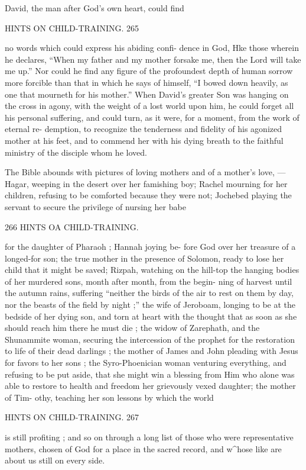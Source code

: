 \documentclass[
]{book}
\begin{document}
David, the man after God's own heart, could find

HINTS ON CHILD-TRAINING. 265

no words which could express his abiding confi- dence in God, Hke those wherein he declares, ``When my father and my mother forsake me, then the Lord will take me up.'' Nor could he find any figure of the profoundest depth of human sorrow more forcible than that in which he says of himself, ``I bowed down heavily, as one that mourneth for his mother.'' When David's greater Son was hanging on the cross in agony, with the weight of a lost world upon him, he could forget all his personal suffering, and could turn, as it were, for a moment, from the work of eternal re- demption, to recognize the tenderness and fidelity of his agonized mother at his feet, and to commend her with his dying breath to the faithful ministry of the disciple whom he loved.

The Bible abounds with pictures of loving mothers and of a mother's love, --- Hagar, weeping in the desert over her famishing boy; Rachel mourning for her children, refusing to be comforted because they were not; Jochebed playing the servant to secure the privilege of nursing her babe

266 HINTS OA CHILD-TRAINING.

for the daughter of Pharaoh ; Hannah joying be- fore God over her treasure of a longed-for son; the true mother in the presence of Solomon, ready to lose her child that it might be saved; Rizpah, watching on the hill-top the hanging bodies of her murdered sons, month after month, from the begin- ning of harvest until the autumn rains, suffering ``neither the birds of the air to rest on them by day, nor the beasts of the field by night ;'' the wife of Jeroboam, longing to be at the bedside of her dying son, and torn at heart with the thought that as soon as she should reach him there he must die ; the widow of Zarephath, and the Shunammite woman, securing the intercession of the prophet for the restoration to life of their dead darlings ; the mother of James and John pleading with Jesus for favors to her sons ; the Syro-Phoenician woman venturing everything, and refusing to be put aside, that she might win a blessing from Him who alone was able to restore to health and freedom her grievously vexed daughter; the mother of Tim- othy, teaching her son lessons by which the world

HINTS ON CHILD-TRAINING. 267

is still profiting ; and so on through a long list of those who were representative mothers, chosen of God for a place in the sacred record, and w\^{}hose like are about us still on every side.
\end{document}
